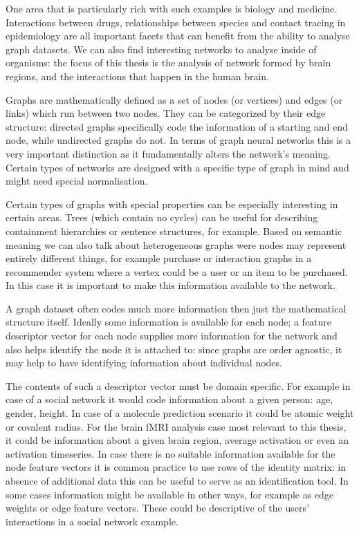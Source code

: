 	One area that is particularly rich with such examples is biology and medicine\cite{zhang2021graph}. Interactions between drugs, relationships between species and contact tracing in epidemiology are all important facets that can benefit from the ability to analyse graph datasets. We can also find interesting networks to analyse inside of organisms: the focus of this thesis is the analysis of network formed by brain regions, and the interactions that happen in the human brain.
	
	Graphs are mathematically defined as a set of nodes (or vertices) and edges (or links) which run between two nodes. They can be categorized by their edge structure: directed graphs specifically code the information of a starting and end node, while undirected graphs do not. In terms of graph neural networks this is a very important distinction as it fundamentally alters the network's meaning. Certain types of networks are designed with a specific type of graph in mind and might need special normalisation.
	
	Certain types of graphs with special properties can be especially interesting in certain areas. Trees (which contain no cycles) can be useful for describing containment hierarchies or sentence structures, for example. Based on semantic meaning we can also talk about heterogeneous graphs were nodes may represent entirely different things, for example purchase or interaction graphs in a recommender system where a vertex could be a user or an item to be purchased. In this case it is important to make this information available to the network.
	
	A graph dataset often codes much more information then just the mathematical structure itself. Ideally some information is available for each node; a feature descriptor vector for each node supplies more information for the network and also helps identify the node it is attached to: since graphs are order agnostic, it may help to have identifying information about individual nodes. 
	
	The contents of such a descriptor vector must be domain specific. For example in case of a social network it would code information about a given person: age, gender, height. In case of a molecule prediction scenario it could be atomic weight or covalent radius. For the brain fMRI analysis case most relevant to this thesis, it could be information about a given brain region, average activation or even an activation timeseries\cite{VAROQUAUX2013405}. In case there is no suitable information available for the node feature vectors it is common practice to use rows of the identity matrix: in absence of additional data this can be useful to serve as an identification tool. In some cases information might be available in other ways, for example as edge weights or edge feature vectors. These could be descriptive of the users' interactions in a social network example.
	
